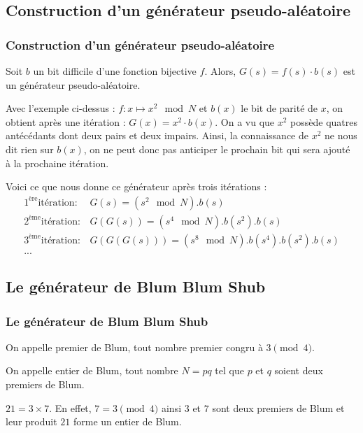 \documentclass[utf8,10pt,french]{beamer}
\begin{document}
\subsection{Construction d'un générateur pseudo-aléatoire}

\begin{frame}
  \frametitle{Construction d'un générateur pseudo-aléatoire}
\begin{definition}
Soit $b$ un bit difficile d'une fonction bijective $f$. Alors, $G(s) = f(s) \cdot b(s)$ est un générateur pseudo-aléatoire.
\end{definition} \pause
\begin{example}
Avec l'exemple ci-dessus : $f:x \mapsto x^2 \mod{N}$ et $b(x)$ le bit de parité de $x$, on obtient après une itération : $G(x)=x^2 \cdot b(x)$. On a vu que $x^2$ possède quatres antécédants dont deux pairs et deux impairs. Ainsi, la connaissance de $x^2$ ne nous dit rien sur $b(x)$, on ne peut donc pas anticiper le prochain bit qui sera ajouté à la prochaine itération. 
\end{example}
\end{frame}

\begin{frame}
\begin{example}
Voici ce que nous donne ce générateur après trois itérations :
 \begin{align}
1^{\mbox{ère}} \mbox{itération}: &G(s)=(s^2 \mod{N}) . b(s)\\
2^{\mbox{ème}} \mbox{itération}: & G(G(s))= (s^4 \mod{N}) . b(s^2) . b(s) \\
3^{\mbox{ème}} \mbox{itération}: & G(G(G(s)))=(s^8 \mod{N}). b(s^4) . b(s^2) . b(s)\\
...
\end{align}
\end{example}
\end{frame}

\subsection{Le générateur de Blum Blum Shub}

\begin{frame}
\frametitle{Le générateur de Blum Blum Shub}
\begin{definition}
On appelle premier de Blum, tout nombre premier congru à $3 \pmod{4}$.
\end{definition} \pause
\begin{definition}
On appelle entier de Blum, tout nombre $N=pq$ tel que $p$ et $q$ soient deux premiers de Blum.
\end{definition} \pause
\begin{example}
$21=3 \times 7$. En effet, $7=3 \pmod{4}$ ainsi $3$ et $7$ sont deux premiers de Blum et leur produit $21$ forme un entier de Blum.
\end{example} 
\end{frame}
\end{document}
